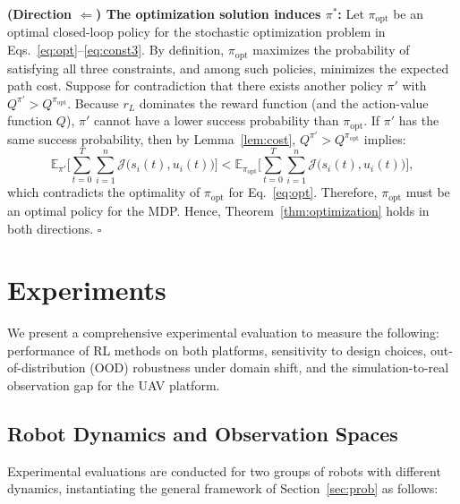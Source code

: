 \documentclass{article}
\begin{document}
\textbf{(Direction $\Leftarrow$) The optimization solution induces $\pi^*$:} Let $\pi_{\mathrm{opt}}$ be an optimal closed-loop policy for the stochastic optimization problem in Eqs.~\eqref{eq:opt}--\eqref{eq:const3}. By definition, $\pi_{\mathrm{opt}}$ maximizes the probability of satisfying all three constraints, and among such policies, minimizes the expected path cost. Suppose for contradiction that there exists another policy $\pi'$ with $Q^{\pi'} > Q^{\pi_{\mathrm{opt}}}$. Because $r_L$ dominates the reward function (and the action-value function $Q$), $\pi'$ cannot have a lower success probability than $\pi_{\mathrm{opt}}$. If $\pi'$ has the same success probability, then by Lemma~\ref{lem:cost}, $Q^{\pi'} > Q^{\pi_{\mathrm{opt}}}$ implies:
\[
\mathbb{E}_{\pi'} \Big[\sum_{t=0}^T \sum_{i=1}^n \mathcal{J} \big(s_i(t), u_i(t)\big)\Big]
< \mathbb{E}_{\pi_{\mathrm{opt}}} \Big[\sum_{t=0}^T \sum_{i=1}^n \mathcal{J} \big(s_i(t), u_i(t)\big)\Big],
\]
which contradicts the optimality of $\pi_{\mathrm{opt}}$ for Eq.~\eqref{eq:opt}. Therefore, $\pi_{\mathrm{opt}}$ must be an optimal policy for the MDP. Hence, Theorem~\ref{thm:optimization} holds in both directions. \hfill$\square$

\section{Experiments}
\label{sec:exp}

We present a comprehensive experimental evaluation to measure the following: performance of RL methods on both platforms, sensitivity to design choices, out-of-distribution (OOD) robustness under domain shift, and the simulation-to-real observation gap for the UAV platform.

\subsection{Robot Dynamics and Observation Spaces}
\label{sec:exp:dynamics}

Experimental evaluations are conducted for two groups of robots with different dynamics, instantiating the general framework of Section~\ref{sec:prob} as follows:
\end{document}

